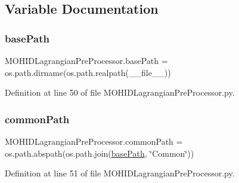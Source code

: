 \subsection{Variable Documentation}
\mbox{\label{namespace_m_o_h_i_d_lagrangian_pre_processor_ac4a3b30ba4c365ff9860cd0a3fef33f9}} 
\subsubsection{\texorpdfstring{base\+Path}{basePath}}
{\footnotesize\ttfamily M\+O\+H\+I\+D\+Lagrangian\+Pre\+Processor.\+base\+Path = os.\+path.\+dirname(os.\+path.\+realpath(\+\_\+\+\_\+file\+\_\+\+\_\+))}



Definition at line 50 of file M\+O\+H\+I\+D\+Lagrangian\+Pre\+Processor.\+py.

\mbox{\label{namespace_m_o_h_i_d_lagrangian_pre_processor_a376fac9ba04258bdbbe80e19173a7244}} 
\subsubsection{\texorpdfstring{common\+Path}{commonPath}}
{\footnotesize\ttfamily M\+O\+H\+I\+D\+Lagrangian\+Pre\+Processor.\+common\+Path = os.\+path.\+abspath(os.\+path.\+join(\mbox{\hyperlink{namespace_m_o_h_i_d_lagrangian_pre_processor_ac4a3b30ba4c365ff9860cd0a3fef33f9}{base\+Path}}, \char`\"{}Common\char`\"{}))}



Definition at line 51 of file M\+O\+H\+I\+D\+Lagrangian\+Pre\+Processor.\+py.

